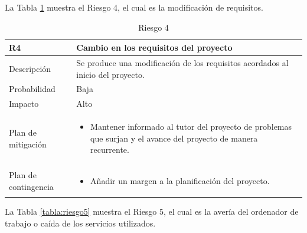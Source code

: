La Tabla \ref{tabla:riesgo4} muestra el Riesgo 4, el cual es la modificación de requisitos.

\begin{table}[!htb]
    \footnotesize
    \begin{tabular}{|>{\arraybackslash}m{3.15cm} | >{\arraybackslash}m{10cm} |}
        \hline
        \vspace{0.5em} \textbf{ R4 } \vspace{0.5em} & \vspace{0.5em} \textbf{Cambio en los requisitos del proyecto} \vspace{0.5em} \\
        \hline 
        \vspace{0.5em} Descripción \vspace{0.5em} & \vspace{0.5em} Se produce una modificación de los requisitos acordados al inicio del proyecto. \vspace{0.5em} \\
        \hline
        \vspace{0.5em} Probabilidad \vspace{0.5em} & \vspace{0.5em} Baja \vspace{0.5em} \\
        \hline
        \vspace{0.5em} Impacto \vspace{0.5em} & \vspace{0.5em} Alto \vspace{0.5em} \\
        \hline
        Plan de mitigación & 
        \begin{itemize}
            \item Mantener informado al tutor del proyecto de problemas que surjan y el avance del proyecto de manera recurrente.
        \end{itemize} \\
        \hline
        Plan de contingencia & 
        \begin{itemize}
            \item Añadir un margen a la planificación del proyecto.
        \end{itemize} \\
        \hline
    \end{tabular}
    \caption{Riesgo 4}
    \label{tabla:riesgo4}
\end{table}
\clearpage
La Tabla \ref{tabla:riesgo5} muestra el Riesgo 5, el cual es la avería del ordenador de trabajo o caída de los servicios utilizados.

